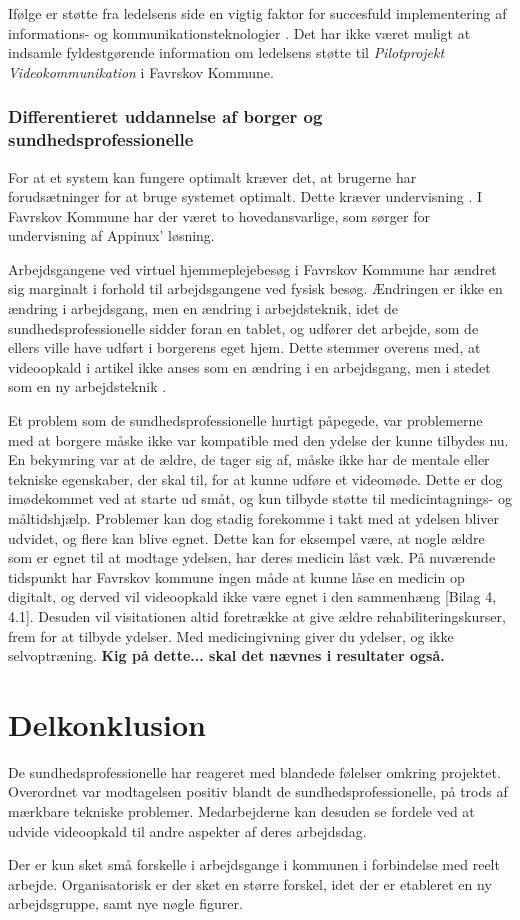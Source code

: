 Ifølge  er støtte fra ledelsens side en vigtig faktor for succesfuld implementering af informations- og kommunikationsteknologier \cite{Ikt}. Det har ikke været muligt at indsamle fyldestgørende information om ledelsens støtte til \textit{Pilotprojekt Videokommunikation} i Favrskov Kommune. 

\subsubsection{Differentieret uddannelse af borger og sundhedsprofessionelle}
For at et system kan fungere optimalt kræver det, at brugerne har forudsætninger for at bruge systemet optimalt. Dette kræver undervisning \cite{Ikt}. I Favrskov Kommune har der været to hovedansvarlige, som sørger for undervisning af Appinux' løsning. 

Arbejdsgangene ved virtuel hjemmeplejebesøg i Favrskov Kommune har ændret sig marginalt i forhold til arbejdsgangene ved fysisk besøg. Ændringen er ikke en ændring i arbejdsgang, men en ændring i arbejdsteknik, idet de sundhedsprofessionelle sidder foran en tablet, og udfører det arbejde, som de ellers ville have udført i borgerens eget hjem. Dette stemmer overens med, at videoopkald i artikel  ikke anses som en ændring i en arbejdsgang, men i stedet som en ny arbejdsteknik \cite{telenursing}.  

Et problem som de sundhedsprofessionelle hurtigt påpegede, var problemerne med at borgere måske ikke var kompatible med den ydelse der kunne tilbydes nu. En bekymring var at de ældre, de tager sig af, måske ikke har de mentale eller tekniske egenskaber, der skal til, for at kunne udføre et videomøde. Dette er dog imødekommet ved at starte ud småt, og kun tilbyde støtte til medicintagnings- og måltidshjælp. Problemer kan dog stadig forekomme i takt med at ydelsen bliver udvidet, og flere kan blive egnet. Dette kan for eksempel være, at nogle ældre som er egnet til at modtage ydelsen, har deres medicin låst væk. På nuværende tidspunkt har Favrskov kommune ingen måde at kunne låse en medicin op digitalt, og derved vil videoopkald ikke være egnet i den sammenhæng [Bilag 4, 4.1]. Desuden vil visitationen altid foretrække at give ældre rehabiliteringskurser, frem for at tilbyde ydelser. Med medicingivning giver du ydelser, og ikke selvoptræning. 
\textbf{Kig på dette... skal det nævnes i resultater også.}


\section{Delkonklusion}
De sundhedsprofessionelle har reageret med blandede følelser omkring projektet. Overordnet var modtagelsen positiv blandt de sundhedsprofessionelle, på trods af mærkbare tekniske problemer. Medarbejderne kan desuden se fordele ved at udvide videoopkald til andre aspekter af deres arbejdsdag. 

Der er kun sket små forskelle i arbejdsgange i kommunen i forbindelse med reelt arbejde. Organisatorisk er der sket en større forskel, idet der er etableret en ny arbejdsgruppe, samt nye nøgle figurer.
